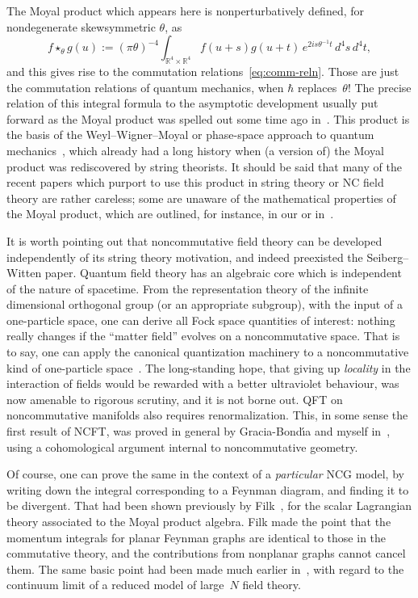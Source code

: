 \documentclass[a4paper,12pt]{article}
\newcommand{\R}{\mathbb{R}}         %
\newcommand{\x}{\times}             %
\newcommand{\1}{\mathbf{1}}         %
\newcommand{\7}{\dagger}            %
\newcommand{\8}{\bullet}            %
\renewcommand{\.}{\cdot}            %
\renewcommand{\:}{\colon}           %
\begin{document}
The Moyal product which appears here is nonperturbatively defined, for
nondegenerate skewsymmetric $\theta$, as
$$
f \star_\theta g(u) := (\pi\theta)^{-4}
\int_{\R^4\x\R^4} f(u + s)g(u + t)\,e^{2is\theta^{-1}t}\,d^4s\,d^4t,
$$
and this gives rise to the commutation relations~\eqref{eq:comm-reln}.
Those are just the commutation relations of quantum mechanics, when
$\hbar$ replaces~$\theta$! The precise relation of this integral
formula to the asymptotic development usually put forward as the
Moyal product was spelled out some time ago in~\cite{Nereid}. This
product is the basis of the Weyl--Wigner--Moyal or phase-space
approach to quantum mechanics~\cite{Moyal}, which already had a long
history when (a version of) the Moyal product was rediscovered by
string theorists. It should be said that many of the recent papers
which purport to use this product in string theory or NC field theory
are rather careless; some are unaware of the mathematical properties
of the Moyal product, which are outlined, for instance, in our
\cite{Phobos,Deimos} or in~\cite{Selene}.

It is worth pointing out that noncommutative field theory can be
developed independently of its string theory motivation, and indeed
preexisted the Seiberg--Witten paper. Quantum field theory has an
algebraic core which is independent of the nature of spacetime. From
the representation theory of the infinite dimensional orthogonal group
(or an appropriate subgroup), with the input of a one-particle space,
one can derive all Fock space quantities of interest: nothing really
changes if the ``matter field'' evolves on a noncommutative space.
That is to say, one can apply the canonical quantization machinery to
a noncommutative kind of one-particle space~\cite{Atlas}. The
long-standing hope, that giving up \textit{locality} in the
interaction of fields would be rewarded with a better ultraviolet
behaviour, was now amenable to rigorous scrutiny, and it is not borne
out. QFT on noncommutative manifolds also requires renormalization.
This, in some sense the first result of NCFT, was proved in general by
Gracia-Bond\'{\i}a and myself in~\cite{Atlas}, using a cohomological 
argument internal to noncommutative geometry.

Of course, one can prove the same in the context of a
\textit{particular} NCG model, by writing down the integral
corresponding to a Feynman diagram, and finding it to be divergent.
That had been shown previously by Filk~\cite{Filk}, for the scalar
Lagrangian theory associated to the Moyal product algebra. Filk made
the point that the momentum integrals for planar Feynman graphs are
identical to those in the commutative theory, and the contributions
from nonplanar graphs cannot cancel them. The same basic point had
been made much earlier in~\cite{GonzalezAKA}, with regard to the
continuum limit of a reduced model of large~$N$ field theory.
\end{document}
